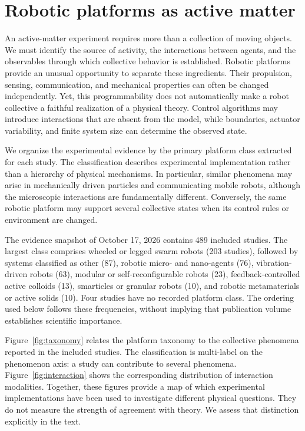 \section{Robotic platforms as active matter}
\label{sec:platforms}

An active-matter experiment requires more than a collection of moving
objects. We must identify the source of activity, the interactions
between agents, and the observables through which collective behavior
is established. Robotic platforms provide an unusual opportunity to
separate these ingredients. Their propulsion, sensing, communication,
and mechanical properties can often be changed independently. Yet,
this programmability does not automatically make a robot collective
a faithful realization of a physical theory. Control algorithms may
introduce interactions that are absent from the model, while
boundaries, actuator variability, and finite system size can
determine the observed state.

We organize the experimental evidence by the primary platform class
extracted for each study. The classification describes experimental
implementation rather than a hierarchy of physical mechanisms.
In particular, similar phenomena may arise in mechanically driven
particles and communicating mobile robots, although the microscopic
interactions are fundamentally different. Conversely, the same
robotic platform may support several collective states when its
control rules or environment are changed.

The evidence snapshot of October 17, 2026 contains 489 included
studies. The largest class comprises wheeled or legged swarm robots
(203 studies), followed by systems classified as other (87),
robotic micro- and nano-agents (76), vibration-driven robots (63),
modular or self-reconfigurable robots (23), feedback-controlled
active colloids (13), smarticles or granular robots (10), and
robotic metamaterials or active solids (10). Four studies have
no recorded platform class. The ordering used below follows
these frequencies, without implying that publication volume
establishes scientific importance.

Figure~\ref{fig:taxonomy} relates the platform taxonomy to the
collective phenomena reported in the included studies. The
classification is multi-label on the phenomenon axis: a study
can contribute to several phenomena. Figure~\ref{fig:interaction}
shows the corresponding distribution of interaction modalities.
Together, these figures provide a map of which experimental
implementations have been used to investigate different physical
questions. They do not measure the strength of agreement with
theory. We assess that distinction explicitly in the text.


